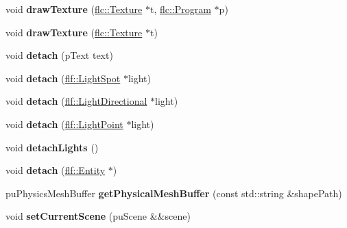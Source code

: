 \begin{DoxyCompactItemize}
void {\bfseries draw\+Texture} (\hyperlink{classflw_1_1flc_1_1Texture}{flc\+::\+Texture} $\ast$t, \hyperlink{classflw_1_1flc_1_1Program}{flc\+::\+Program} $\ast$p)
\item 
\mbox{\label{classflw_1_1Engine_a4d587f6fb90fc7a768de763dce482f09}} 
void {\bfseries draw\+Texture} (\hyperlink{classflw_1_1flc_1_1Texture}{flc\+::\+Texture} $\ast$t)
\item 
\mbox{\label{classflw_1_1Engine_a5332338c3dbbeddd07a17a2e54ec4c56}} 
void {\bfseries detach} (p\+Text text)
\item 
\mbox{\label{classflw_1_1Engine_ae9875ee870b6a6ced53f326b6f5d5624}} 
void {\bfseries detach} (\hyperlink{classflw_1_1flf_1_1LightSpot}{flf\+::\+Light\+Spot} $\ast$light)
\item 
\mbox{\label{classflw_1_1Engine_ad60883038374172d30c55545df440da2}} 
void {\bfseries detach} (\hyperlink{classflw_1_1flf_1_1LightDirectional}{flf\+::\+Light\+Directional} $\ast$light)
\item 
\mbox{\label{classflw_1_1Engine_ad315c597cc2919ec2b1c0528b3d4b8d9}} 
void {\bfseries detach} (\hyperlink{classflw_1_1flf_1_1LightPoint}{flf\+::\+Light\+Point} $\ast$light)
\item 
\mbox{\label{classflw_1_1Engine_a22021b98e5911ba083cd85d09b9e2edb}} 
void {\bfseries detach\+Lights} ()
\item 
\mbox{\label{classflw_1_1Engine_a28a44080d29beb1bb029661878f29287}} 
void {\bfseries detach} (\hyperlink{classflw_1_1flf_1_1Entity}{flf\+::\+Entity} $\ast$)
\item 
\mbox{\label{classflw_1_1Engine_aa0886491c6b278c99c51e389415aa46f}} 
pu\+Physics\+Mesh\+Buffer {\bfseries get\+Physical\+Mesh\+Buffer} (const std\+::string \&shape\+Path)
\item 
\mbox{\label{classflw_1_1Engine_a15a611c51dec7cca5d9f53aa433c64ea}} 
void {\bfseries set\+Current\+Scene} (pu\+Scene \&\&scene)
\item 
\mbox{\label{classflw_1_1Engine_af592feb4469f5632eba334e393de6f7d}} 

\end{DoxyCompactItemize}
